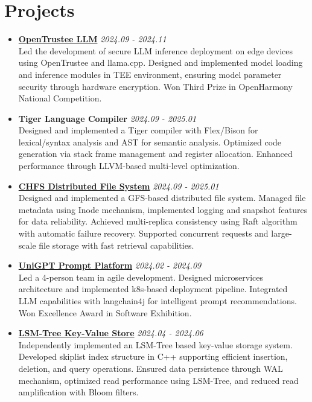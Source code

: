 \documentclass[a4paper]{article}
\begin{document}
\section*{Projects}
\begin{itemize}[leftmargin=*,label={},itemsep=0.3em,topsep=0.1em]
\item \textbf{\href{https://gitee.com/qiweic10/open-trustee_-llm_app}{OpenTrustee LLM}} \hfill \textit{2024.09 - 2024.11}\\
Led the development of secure LLM inference deployment on edge devices using OpenTrustee and llama.cpp. Designed and implemented model loading and inference modules in TEE environment, ensuring model parameter security through hardware encryption. Won Third Prize in OpenHarmony National Competition.

\item \textbf{Tiger Language Compiler} \hfill \textit{2024.09 - 2025.01}\\
Designed and implemented a Tiger compiler with Flex/Bison for lexical/syntax analysis and AST for semantic analysis. Optimized code generation via stack frame management and register allocation. Enhanced performance through LLVM-based multi-level optimization.

\item \textbf{\href{https://github.com/kiwi142857/CSE-chfs}{CHFS Distributed File System}} \hfill \textit{2024.09 - 2025.01}\\
Designed and implemented a GFS-based distributed file system. Managed file metadata using Inode mechanism, implemented logging and snapshot features for data reliability. Achieved multi-replica consistency using Raft algorithm with automatic failure recovery. Supported concurrent requests and large-scale file storage with fast retrieval capabilities.

\item \textbf{\href{https://github.com/UniGPT-SJTU}{UniGPT Prompt Platform}} \hfill \textit{2024.02 - 2024.09}\\
Led a 4-person team in agile development. Designed microservices architecture and implemented k8s-based deployment pipeline. Integrated LLM capabilities with langchain4j for intelligent prompt recommendations. Won Excellence Award in Software Exhibition.

\item \textbf{\href{https://github.com/kiwi142857/LSM-Tree}{LSM-Tree Key-Value Store}} \hfill \textit{2024.04 - 2024.06}\\
Independently implemented an LSM-Tree based key-value storage system. Developed skiplist index structure in C++ supporting efficient insertion, deletion, and query operations. Ensured data persistence through WAL mechanism, optimized read performance using LSM-Tree, and reduced read amplification with Bloom filters.


\end{itemize}
\end{document}

